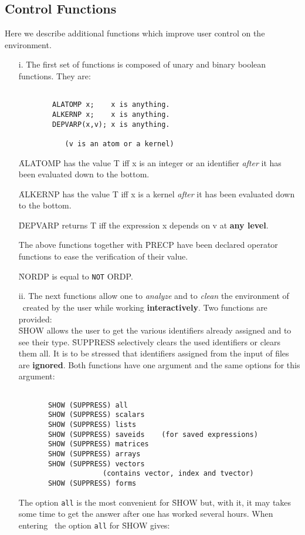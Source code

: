 \subsection{Control Functions}
Here we describe additional functions which
improve user control on the environment.
\begin{itemize}
\item[i.]
The first set of functions is composed of unary and binary boolean functions.
They are:
\begin{verbatim}

        ALATOMP x;    x is anything.
        ALKERNP x;    x is anything.
        DEPVARP(x,v); x is anything.

           (v is an atom or a kernel)

\end{verbatim}
\f{ALATOMP} has the value T iff x is an integer or  an identifier
{\em after} it has been evaluated down to the bottom.

\f{ALKERNP} has the value T iff x is a kernel {\em after}
it has been evaluated down to the bottom.

\f{DEPVARP} returns T iff the expression x depends on v at
{\bf any level}.

The above functions together with \f{PRECP} have
 been declared operator functions to ease the verification of
their value.

\f{NORDP} is equal to \verb+NOT+\f{ ORDP}.
\item[ii.]
The next functions allow one to {\em analyze} and to
{\em clean} the environment
of \REDUCE\ created by the user while working
{\bf interactively}. Two functions are provided:\\
\f{SHOW} allows the user to get the various identifiers already
assigned and to see their type. \f{SUPPRESS} selectively clears the
used identifiers or clears them all. It is to be stressed that identifiers
assigned from the input of files are {\bf ignored}.
Both functions have one argument and the same options for this
argument:
\begin{verbatim}

       SHOW (SUPPRESS) all
       SHOW (SUPPRESS) scalars
       SHOW (SUPPRESS) lists
       SHOW (SUPPRESS) saveids    (for saved expressions)
       SHOW (SUPPRESS) matrices
       SHOW (SUPPRESS) arrays
       SHOW (SUPPRESS) vectors
                    (contains vector, index and tvector)
       SHOW (SUPPRESS) forms

\end{verbatim}
The option \verb+all+ is the most convenient for \f{SHOW} but,
with it, it may
takes some time to get the answer after one has worked several hours.
When entering \REDUCE\ the option \verb+all+ for \f{SHOW} gives:
\begin{verbatim}


\end{verbatim}
\end{itemize}
